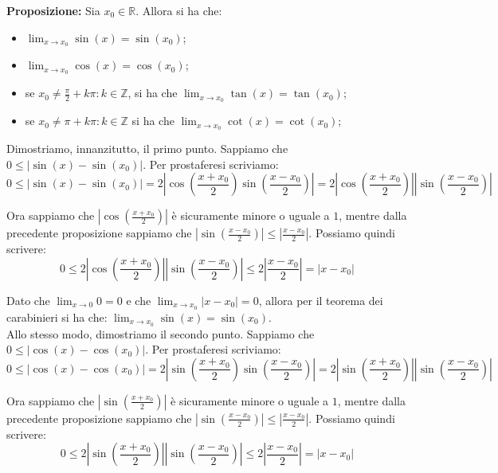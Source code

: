 \documentclass{article}
\begin{document}
\noindent\textbf{Proposizione:} Sia $x_0 \in \mathbb{R}$. Allora si ha che:
\begin{itemize}
    \item $\lim_{x \to x_0} \sin(x) = \sin(x_0)$;
    \item $\lim_{x \to x_0} \cos(x) = \cos(x_0)$;
    \item se $x_0 \neq \frac{\pi}{2} + k\pi : k \in \mathbb{Z}$, si ha che $\lim_{x \to x_0} \tan(x) = \tan(x_0)$;
    \item se $x_0 \neq \pi + k\pi : k \in \mathbb{Z}$ si ha che $\lim_{x \to x_0} \cot(x) = \cot(x_0)$;
\end{itemize}

\noindent Dimostriamo, innanzitutto, il primo punto. Sappiamo che $0 \leq |\sin(x) - \sin(x_0)|$. Per prostaferesi scriviamo:
\begin{equation*}
    0 \leq |\sin(x) - \sin(x_0)| = 2\left|\cos\left(\frac{x + x_0}{2}\right)\sin\left(\frac{x - x_0}{2}\right)\right| = 2\left|\cos\left(\frac{x + x_0}{2}\right)\right|\left|\sin\left(\frac{x - x_0}{2}\right)\right|
\end{equation*}

\noindent Ora sappiamo che $|\cos(\frac{x + x_0}{2})|$ è sicuramente minore o uguale a $1$, mentre dalla precedente proposizione sappiamo che $|\sin(\frac{x - x_0}{2})| \leq |\frac{x - x_0}{2}|$. Possiamo quindi scrivere:
\begin{equation*}
    0 \leq 2 \left|\cos\left(\frac{x + x_0}{2}\right)\right|\left|\sin\left(\frac{x - x_0}{2}\right)\right| \leq 2 \left|\frac{x - x_0}{2}\right| = |x - x_0|
\end{equation*}

\noindent Dato che $\lim_{x \to 0} 0 = 0$ e che $\lim_{x \to x_0} |x - x_0| = 0$, allora per il teorema dei carabinieri si ha che: $\lim_{x \to x_0} \sin(x) = \sin(x_0)$.\\

\noindent Allo stesso modo, dimostriamo il secondo punto. Sappiamo che $0 \leq |\cos(x) - \cos(x_0)|$. Per prostaferesi scriviamo:
\begin{equation*}
    0 \leq |\cos(x) - \cos(x_0)| = 2 \left|\sin\left(\frac{x + x_0}{2}\right)\sin\left(\frac{x - x_0}{2}\right)\right| = 2\left|\sin\left(\frac{x + x_0}{2}\right)\right|\left|\sin\left(\frac{x - x_0}{2}\right)\right|
\end{equation*}

\noindent Ora sappiamo che $|\sin(\frac{x + x_0}{2})|$ è sicuramente minore o uguale a $1$, mentre dalla precedente proposizione sappiamo che $|\sin(\frac{x - x_0}{2})| \leq |\frac{x - x_0}{2}|$. Possiamo quindi scrivere:
\begin{equation*}
    0 \leq 2\left|\sin\left(\frac{x + x_0}{2}\right)\right|\left|\sin\left(\frac{x - x_0}{2}\right)\right| \leq 2 \left|\frac{x - x_0}{2}\right| = |x - x_0|
\end{equation*}
\end{document}
